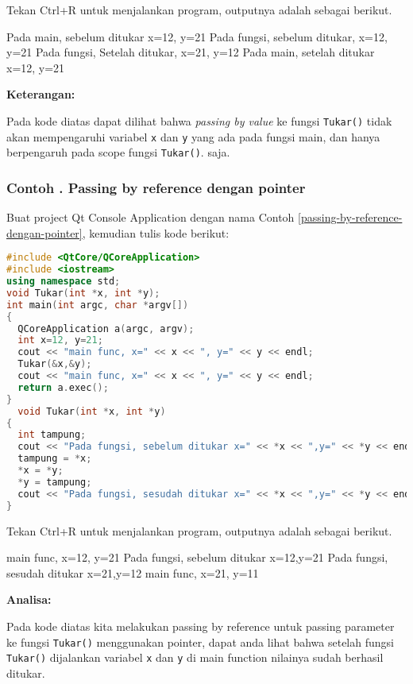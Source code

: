Tekan Ctrl+R untuk menjalankan program, outputnya adalah sebagai
berikut.

\begin{lcverbatim}
Pada main, sebelum ditukar x=12, y=21
Pada fungsi, sebelum ditukar, x=12, y=21
Pada fungsi, Setelah ditukar, x=21, y=12
Pada main, setelah ditukar x=12, y=21
\end{lcverbatim}

\textbf{Keterangan:}

Pada kode diatas dapat dilihat bahwa \emph{passing by value} ke fungsi
\texttt{Tukar()} tidak akan mempengaruhi variabel \texttt{x} dan
\texttt{y} yang ada pada fungsi main, dan hanya berpengaruh pada scope
fungsi \texttt{Tukar()}. saja.

\subsubsection*{Contoh . Passing by reference dengan pointer}

Buat project Qt Console Application dengan nama Contoh \ref{passing-by-reference-dengan-pointer}, kemudian
tulis kode berikut:

\begin{lstlisting}[language=c++, caption=Passing by reference dengan pointer, label=passing-by-reference-dengan-pointer]
#include <QtCore/QCoreApplication>
#include <iostream>
using namespace std;
void Tukar(int *x, int *y);
int main(int argc, char *argv[])
{
  QCoreApplication a(argc, argv);
  int x=12, y=21;
  cout << "main func, x=" << x << ", y=" << y << endl;
  Tukar(&x,&y);
  cout << "main func, x=" << x << ", y=" << y << endl;
  return a.exec();
}
  void Tukar(int *x, int *y)
{
  int tampung;
  cout << "Pada fungsi, sebelum ditukar x=" << *x << ",y=" << *y << endl;
  tampung = *x;
  *x = *y;
  *y = tampung;
  cout << "Pada fungsi, sesudah ditukar x=" << *x << ",y=" << *y << endl;
}
\end{lstlisting}

Tekan Ctrl+R untuk menjalankan program, outputnya adalah sebagai
berikut.

\begin{lcverbatim}
main func, x=12, y=21
Pada fungsi, sebelum ditukar x=12,y=21
Pada fungsi, sesudah ditukar x=21,y=12
main func, x=21, y=11
\end{lcverbatim}

\textbf{Analisa:}

Pada kode diatas kita melakukan passing by reference untuk passing
parameter ke fungsi \texttt{Tukar()} menggunakan pointer, dapat anda
lihat bahwa setelah fungsi \texttt{Tukar()} dijalankan variabel
\texttt{x} dan \texttt{y} di main function nilainya sudah berhasil
ditukar.

